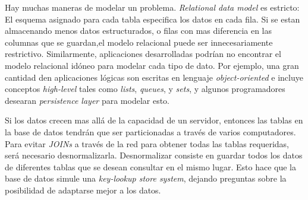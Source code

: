 Hay muchas maneras de modelar un problema. \textit{Relational data model} es estricto: El esquema asignado para cada tabla especifica los datos en cada fila. Si se estan almacenando menos datos estructurados, o filas con mas diferencia en las columnas que se guardan,el modelo relacional puede ser innecesariamente restrictivo. Similarmente, aplicaciones desarrolladas podrían no encontrar el modelo relacional idóneo para modelar cada tipo de dato. Por ejemplo, una gran cantidad den aplicaciones lógicas son escritas en lenguaje \textit{object-oriented} e incluye conceptos \textit{high-level} tales como \textit{lists}, \textit{queues}, y \textit{sets}, y algunos programadores desearan \textit{persistence layer} para modelar esto.

Si los datos crecen mas allá de la capacidad de un servidor, entonces las tablas en la base de datos tendrán que ser particionadas a través de varios computadores. Para evitar \textit{JOINs} a través de la red para obtener todas las tablas requeridas, será necesario desnormalizarla. Desnormalizar consiste en guardar todos los datos de diferentes tablas que se desean consultar en el mismo lugar. Esto hace que la base de datos simule una \textit{key-lookup store system}, dejando preguntas sobre la posibilidad de adaptarse mejor a los datos.


